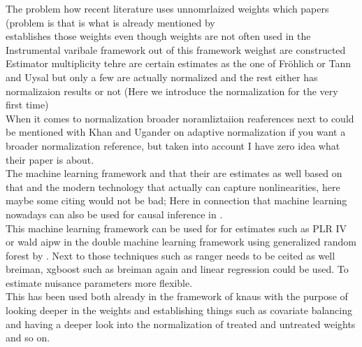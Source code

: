 \documentclass[12pt, a4paper, oneside]{article}
\theoremstyle{plain}
\theoremstyle{definition}
\begin{document}
The problem how recent literature uses unnomrlaized weights which papers (problem is that is what is already mentioned by \citet{sloczynski2025abadie}\\
\citet{abadie2003semiparametric} establishes those weights even though weights are not often used in the Instrumental varibale framework \citet{sloczynski2025abadie} out of this framework weighst are constructed\\
Estimator multiplicity tehre are certain estimates as the one of Fröhlich or Tann and Uysal but only a few are actually normalized and the rest either has normalizaion results or not (Here we introduce the normalization for the very first time)\\
When it comes to normalization broader noramliztaiion reaferences next to \citet{sloczynski2025abadie} could be mentioned with Khan and Ugander on adaptive normalization if you want a broader normalization reference,  but taken into account I have zero idea what their paper is about. 
\\
The machine learning framework and that their are estimates as well based on that and the modern technology that actually can capture nonlinearities, here maybe some citing would not be bad; Here in connection that machine learning nowadays can also be used for causal inference in \citet{chernozhukov2018double}.
\\ This machine learning framework can be used for for estimates such as PLR IV or wald aipw in the double machine learning framework using generalized random forest by \citet{athey2019generalized}.
Next to those techniques such as ranger needs to be ceited as well breiman, xgboost such as breiman again and linear regression could be used. To estimate nuisance parameters more flexible. 
\\ This has been used both already in the framework of knaus with the purpose of looking deeper in the weights and establishing things such as covariate balancing and having a deeper look into the normalization of treated and untreated weights and so on.
\end{document}
